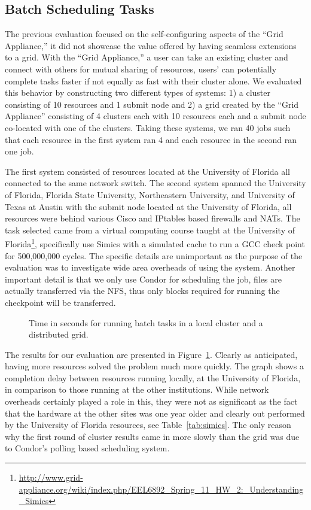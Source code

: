 \documentclass[twocolumn]{svjour3}
\begin{document}
\subsection{Batch Scheduling Tasks}

The previous evaluation focused on the self-configuring aspects of the ``Grid
Appliance,'' it did not showcase the value offered by having seamless
extensions to a grid.  With the ``Grid Appliance,'' a user can take an existing
cluster and connect with others for mutual sharing of resources, users' can
potentially complete tasks faster if not equally as fast with their cluster
alone.  We evaluated this behavior by constructing two different types of
systems: 1) a cluster consisting of 10 resources and 1 submit node and 2) a
grid created by the ``Grid Appliance'' consisting of 4 clusters each with 10
resources each and a submit node co-located with one of the clusters.  Taking
these systems, we ran 40 jobs such that each resource in the first system ran 4
and each resource in the second ran one job.

The first system consisted of resources located at the University of Florida
all connected to the same network switch.  The second system spanned the
University of Florida, Florida State University, Northeastern University, and
University of Texas at Austin with the submit node located at the University of
Florida, all resources were behind various Cisco and IPtables based firewalls
and NATs.  The task selected came from a virtual computing course taught at the
University of
Florida\footnote{\url{http://www.grid-appliance.org/wiki/index.php/EEL6892_Spring_11_HW_2:_Understanding_Simics}},
specifically use Simics with a simulated cache to run a GCC check point for
500,000,000 cycles.  The specific details are unimportant as the purpose of the
evaluation was to investigate wide area overheads of using the system.  Another
important detail is that we only use Condor for scheduling the job, files are
actually transferred via the NFS, thus only blocks required for running the
checkpoint will be transferred.

\begin{figure}[ht]
\centering
{}
\caption{Time in seconds for running batch tasks in a local cluster and a
distributed grid.}
\label{fig:simics}
\end{figure}

The results for our evaluation are presented in Figure~\ref{fig:simics}.
Clearly as anticipated, having more resources solved the problem much more
quickly.  The graph shows a completion delay between resources running locally,
at the University of Florida, in comparison to those running at the other
institutions.  While network overheads certainly played a role in this, they
were not as significant as the fact that the hardware at the other sites was
one year older and clearly out performed by the University of Florida
resources, see Table~\ref{tab:simics}.  The only reason why the first round of
cluster results came in more slowly than the grid was due to Condor's polling
based scheduling system.
\end{document}
